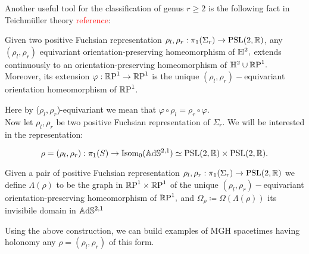 Another useful tool for the classification of genus $r\geq 2$ is the following fact in Teichm\"uller theory \textcolor{red}{reference}:

\begin{lemma}
    Given two positive Fuchsian representation $\rho_l,\rho_r:\pi_1(\Sigma_r)\to\text{PSL}(2,\mathbb{R})$, any $(\rho_l,\rho_r)$ equivariant orientation-preserving homeomorphism of $\mathbb{H}^2,$ extends continuously to an orientation-preserving homeomorphism of $\mathbb{H}^2\cup\mathbb{R}\text{P}^1.$ Moreover, its extension $\varphi:\mathbb{R}\text{P}^1\to\mathbb{R}\text{P}^1$ is the unique $(\rho_l,\rho_r)-$equivariant orientation homeomorphism of $\mathbb{R}\text{P}^1$.     
\end{lemma}

Here by ($\rho_l,\rho_r$)-equivariant we mean that $\varphi\circ\rho_l=\rho_r\circ\varphi.$\\
Now let $\rho_l,\rho_r$ be two positive Fuchsian representation of $\Sigma_r.$ We will be interested in the representation:

\[
    \rho=(\rho_l,\rho_r):\pi_1(S)\to\text{Isom}_0(\mathbb{A}\mathrm{d}\mathbb{S}^{2,1})\simeq \text{PSL}(2,\mathbb{R})\times\text{PSL}(2,\mathbb{R}).
\]

\begin{definition}
    Given a pair of positive Fuchsian representation $\rho_l,\rho_r:\pi_1(\Sigma_r)\to\text{PSL}(2,\mathbb{R})$ we define $\Lambda(\rho)$ to be the graph in $\mathbb{R}\text{P}^1\times\mathbb{R}\text{P}^1$ of the unique $(\rho_l,\rho_r)-$equivariant orientation-preserving homeomorphism of $\mathbb{R}\text{P}^1,$ and $\Omega_\rho \coloneqq \Omega(\Lambda(\rho))$ its invisibile domain in $\mathbb{A}\mathrm{d}\mathbb{S}^{2,1}$
\end{definition}

Using the above construction, we can build examples of MGH spacetimes having holonomy any $\rho=(\rho_l,\rho_r)$ of this form. 


